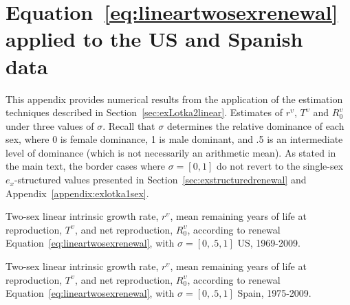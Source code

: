 \chapter{Equation~\ref{eq:lineartwosexrenewal} applied to the US and Spanish
data}
\label{appendix:ex2sexlinear}
This appendix provides numerical results from the application of the
estimation techniques described in Section~\ref{sec:exLotka2linear}. Estimates
of $r^\upsilon$, $T^\upsilon$ and $R_0^\upsilon$ under three values of $\sigma$.
Recall that $\sigma$ determines the relative dominance of each sex, where 0 is
female dominance, 1 is male dominant, and .5 is an intermediate level of
dominance (which is not necessarily an arithmetic mean). As stated in the
main text, the border cases where $\sigma = [0,1]$ do not revert to the
single-sex $e_x$-structured values presented in Section~\ref{sec:exstructuredrenewal} and
Appendix~\ref{appendix:exlotka1sex}.

\begin{table}
  \begin{adjustwidth}{-1in}{-.5in}
  \centering
    \caption{Two-sex linear intrinsic growth rate, $r^\upsilon$, mean remaining
years of life at reproduction, $T^\upsilon$, and net reproduction,
$R_0^\upsilon$, according to renewal Equation~\eqref{eq:lineartwosexrenewal},
with $\sigma = [0, .5, 1]$ US, 1969-2009.}
    \label{tab:ex2linRepUS}
        
  \end{adjustwidth}
\end{table}

\begin{table}
  \begin{adjustwidth}{-1in}{-.5in}
    \centering
    \caption{Two-sex linear intrinsic growth rate, $r^\upsilon$, mean remaining
years of life at reproduction, $T^\upsilon$, and net reproduction,
$R_0^\upsilon$, according to renewal Equation~\eqref{eq:lineartwosexrenewal}, with
$\sigma = [0, .5, 1]$ Spain, 1975-2009.}
    \label{tab:ex2linRepES}
        
  \end{adjustwidth}
\end{table}



